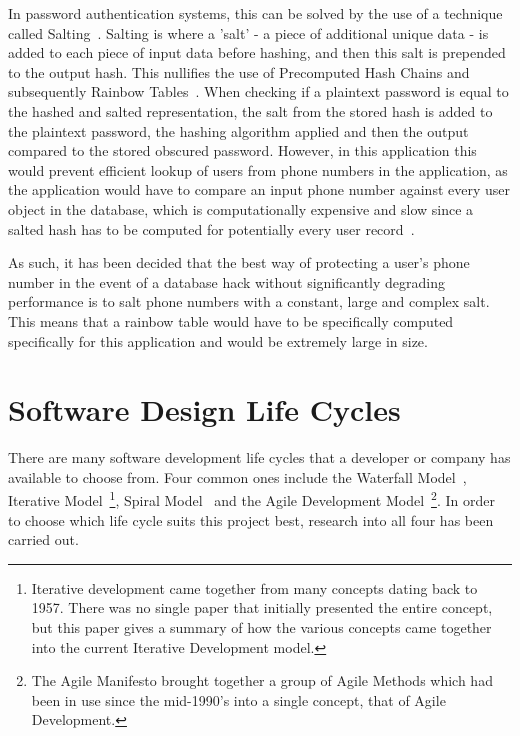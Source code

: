 \documentclass[authoryearcitations]{UoYCSproject}
\begin{document}
In password authentication systems, this can be solved by the use of a technique called Salting~\cite{hashingPasswordsInfoSec}.  Salting is where a 'salt' - a piece of additional unique data - is added to each piece of input data before hashing, and then this salt is prepended to the output hash.  This nullifies the use of Precomputed Hash Chains and subsequently Rainbow Tables~\cite{hashingPasswordsInfoSec}. When checking if a plaintext password is equal to the hashed and salted representation, the salt from the stored hash is added to the plaintext password, the hashing algorithm applied and then the output compared to the stored obscured password. However, in this application this would prevent efficient lookup of users from phone numbers in the application, as the application would have to compare an input phone number against every user object in the database, which is computationally expensive and slow since a salted hash has to be computed for potentially every user record~\cite{hashingPasswordsInfoSec}.  

As such, it has been decided that the best way of protecting a user's phone number in the event of a database hack without significantly degrading performance is to salt phone numbers with a constant, large and complex salt. This means that a rainbow table would have to be specifically computed specifically for this application and would be extremely large in size.

\section{Software Design Life Cycles}
There are many software development life cycles that a developer or company has available to choose from.  Four common ones include the Waterfall Model~\cite{royce1970managing-FirstDescriptionOfWaterFallModelNotByName}, Iterative Model~\cite{briefHistoryOfIncrementalAndIterativeSoftwareDevelopment}\footnote{Iterative development came together from many concepts dating back to 1957.  There was no single paper that initially presented the entire concept, but this paper gives a summary of how the various concepts came together into the current Iterative Development model.}, Spiral Model~\cite{spiralModelSoftwareDevelopment} and the Agile Development Model~\cite{beck2001agile}\footnote{The Agile Manifesto brought together a group of Agile Methods which had been in use since the mid-1990's into a single concept, that of Agile Development.}. In order to choose which life cycle suits this project best, research into all four has been carried out.
\end{document}
